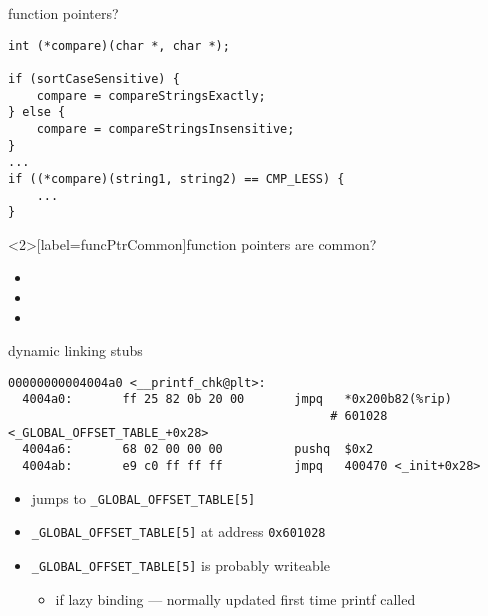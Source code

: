 
\begin{frame}[fragile,label=funcPtrQ]{function pointers?}
\lstset{language=C,style=small}
\begin{lstlisting}
int (*compare)(char *, char *);

if (sortCaseSensitive) {
    compare = compareStringsExactly;
} else {
    compare = compareStringsInsensitive;
}
...
if ((*compare)(string1, string2) == CMP_LESS) {
    ...
}
\end{lstlisting}
\end{frame}

\begin{frame}<2>[label=funcPtrCommon]{function pointers are common?}
    \begin{itemize}
    \item {}
    \item {}
    \item {}
    \end{itemize}
\end{frame}

\begin{frame}[fragile,label=dynStub]{dynamic linking stubs}
\begin{Verbatim}[fontsize=\fontsize{9}{10}\selectfont]
00000000004004a0 <__printf_chk@plt>:
  4004a0:       ff 25 82 0b 20 00       jmpq   *0x200b82(%rip)      
                                             # 601028 <_GLOBAL_OFFSET_TABLE_+0x28>
  4004a6:       68 02 00 00 00          pushq  $0x2
  4004ab:       e9 c0 ff ff ff          jmpq   400470 <_init+0x28>
\end{Verbatim}
\begin{itemize}
\item jumps to \texttt{\_GLOBAL\_OFFSET\_TABLE[5]}
\item \texttt{\_GLOBAL\_OFFSET\_TABLE[5]}  at address \texttt{0x601028}
\item \texttt{\_GLOBAL\_OFFSET\_TABLE[5]} is probably writeable
    \begin{itemize}
    \item if lazy binding --- normally updated first time printf called
    \end{itemize}
\end{itemize}
\end{frame}

